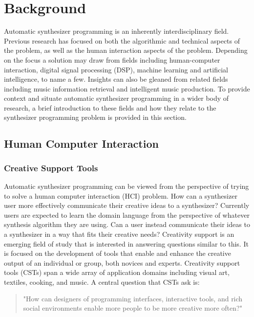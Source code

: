 

\section{Background}
Automatic synthesizer programming is an inherently interdisciplinary field. Previous research has focused on both the algorithmic and technical aspects of the problem, as well as the human interaction aspects of the problem. Depending on the focus a solution may draw from fields including human-computer interaction, digital signal processing (DSP), machine learning and artificial intelligence, to name a few. Insights can also be gleaned from related fields including music information retrieval and intelligent music production. To provide context and situate automatic synthesizer programming in a wider body of research, a brief introduction to these fields and how they relate to the synthesizer programming problem is provided in this section.

\subsection{Human Computer Interaction}
\subsubsection{Creative Support Tools}
Automatic synthesizer programming can be viewed from the perspective of trying to solve a human computer interaction (HCI) problem. How can a synthesizer user more effectively communicate their creative ideas to a synthesizer? Currently users are expected to learn the domain language from the perspective of whatever synthesis algorithm they are using. Can a user instead communicate their ideas to a synthesizer in a way that fits their creative needs? Creativity support is an emerging field of study that is interested in answering questions similar to this. It is focused on the development of tools that enable and enhance the creative output of an individual or group, both novices and experts. Creativity support tools (CSTs) \cite{shneiderman2007creativity} span a wide array of application domains including visual art, textiles, cooking, and music. A central question that CSTs ask is: 
\begin{quote}
    "How can designers of programming interfaces, interactive tools, and rich social environments enable more people to be more creative more often?"
\end{quote}


